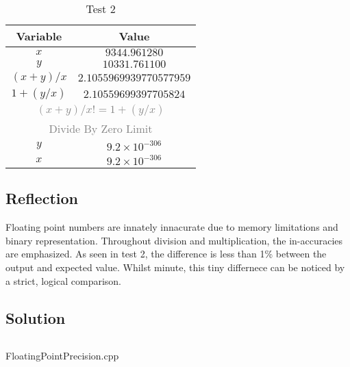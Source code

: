         \vspace{1cm}

        \begin{table}[H]
            \centering
            \begin{tabular}{c c}
                \hline
                \textbf{Variable} & \textbf{Value} \\
                \hline
                \(x\) & \(9344.961280\) \\
                \(y\) & \(10331.761100\) \\
                \hline
                \hline
                \((x + y) / x\) & \(2.1055969939770577959\) \\
                \(1 + (y / x)\) & \(2.10559699397705824\) \\
                \multicolumn{2}{c}{\textcolor{gray}{\((x + y) / x != 1 + ( y / x)\)}} \\
                \hline
                \hline
                \multicolumn{2}{c}{\textcolor{gray}{Divide By Zero Limit}} \\
                \(y\) & \(9.2 \times 10^{-306}\) \\
                \(x\) & \(9.2 \times 10^{-306}\) \\
                \hline
            \end{tabular}
            \caption{Test 2}
        \end{table}

    \subsection*{Reflection}
        Floating point numbers are innately innacurate due to memory limitations and binary representation.
        Throughout division and multiplication, the in-accuracies are emphasized. As seen in
        test 2, the difference is less than 1\% between the output and expected value. Whilst minute,
        this tiny differnece can be noticed by a strict, logical comparison. 
    \subsection*{Solution}
        \begin{listing}[H]
            \inputminted[firstline=10]{cpp}{../Tasks/04-FloatingPointPrecision/FloatingPointPrecision.cpp}
            \caption{FloatingPointPrecision.cpp}
        \end{listing}